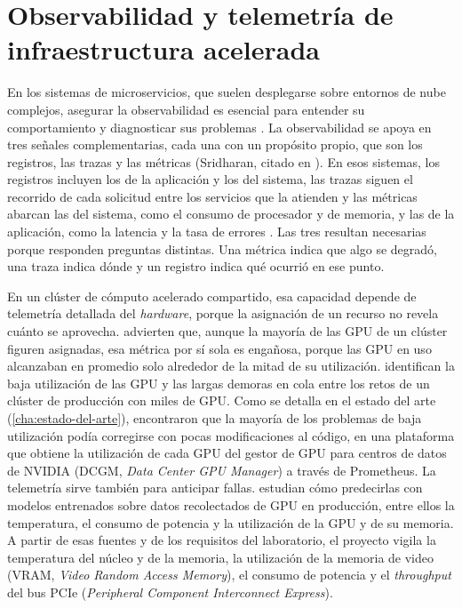 \section{Observabilidad y telemetría de infraestructura acelerada}\label{sec:observabilidad-telemetria}

En los sistemas de microservicios, que suelen desplegarse sobre entornos de nube complejos, asegurar la observabilidad es esencial para entender su comportamiento y diagnosticar sus problemas \citep{li-observabilitysurvey-2021}. La observabilidad se apoya en tres señales complementarias, cada una con un propósito propio, que son los registros, las trazas y las métricas (Sridharan, citado en \citep{li-observabilitysurvey-2021}). En esos sistemas, los registros incluyen los de la aplicación y los del sistema, las trazas siguen el recorrido de cada solicitud entre los servicios que la atienden y las métricas abarcan las del sistema, como el consumo de procesador y de memoria, y las de la aplicación, como la latencia y la tasa de errores \citep{li-observabilitysurvey-2021}. Las tres resultan necesarias porque responden preguntas distintas. Una métrica indica que algo se degradó, una traza indica dónde y un registro indica qué ocurrió en ese punto.

En un clúster de cómputo acelerado compartido, esa capacidad depende de telemetría detallada del \emph{hardware}, porque la asignación de un recurso no revela cuánto se aprovecha. \citet{jeon-philly-2019} advierten que, aunque la mayoría de las GPU de un clúster figuren asignadas, esa métrica por sí sola es engañosa, porque las GPU en uso alcanzaban en promedio solo alrededor de la mitad de su utilización. \citet{weng-mlaasinthewild-2022} identifican la baja utilización de las GPU y las largas demoras en cola entre los retos de un clúster de producción con miles de GPU. Como se detalla en el estado del arte (\cref{cha:estado-del-arte}), \citet{gao-lowgpuutilization-2024} encontraron que la mayoría de los problemas de baja utilización podía corregirse con pocas modificaciones al código, en una plataforma que obtiene la utilización de cada GPU del gestor de GPU para centros de datos de NVIDIA (DCGM, \emph{Data Center GPU Manager}) a través de Prometheus. La telemetría sirve también para anticipar fallas. \citet{liu-gpufailureprediction-2023} estudian cómo predecirlas con modelos entrenados sobre datos recolectados de GPU en producción, entre ellos la temperatura, el consumo de potencia y la utilización de la GPU y de su memoria. A partir de esas fuentes y de los requisitos del laboratorio, el proyecto vigila la temperatura del núcleo y de la memoria, la utilización de la memoria de video (VRAM, \emph{Video Random Access Memory}), el consumo de potencia y el \emph{throughput} del bus PCIe (\emph{Peripheral Component Interconnect Express}).

